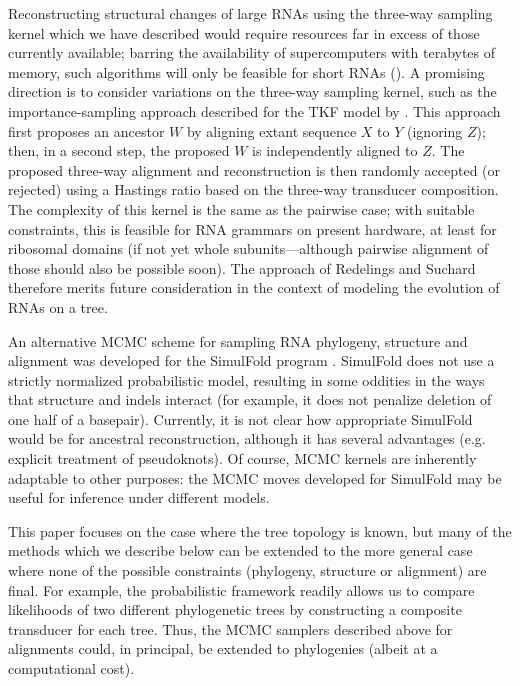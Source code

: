 \documentclass[10pt]{article}
\begin{document}

Reconstructing structural changes of large RNAs
using the three-way sampling kernel which we have described
would require resources far in excess of those currently available;
barring the availability of supercomputers with terabytes of memory,
such algorithms will only be feasible for short RNAs ().
A promising direction is to consider variations on the three-way sampling kernel,
such as the importance-sampling approach described for the TKF model
by \cite{RedelingsSuchard2005}.
This approach first proposes an ancestor $W$ by aligning extant
sequence $X$ to $Y$ (ignoring $Z$); then, in a second step, the proposed $W$ is
independently aligned to $Z$. The proposed three-way alignment and
reconstruction is then randomly accepted (or rejected) using a
Hastings ratio based on the three-way transducer composition. The
complexity of this kernel is the same as the pairwise case;
with suitable constraints, this is feasible for RNA
grammars on present hardware, at least for ribosomal domains (if not
yet whole subunits---although pairwise alignment of those should also
be possible soon). The approach of Redelings and Suchard therefore
merits future consideration in the context of modeling the evolution
of RNAs on a tree.

An alternative MCMC scheme for sampling RNA phylogeny, structure and
alignment was developed for the SimulFold program
\cite{MeyerMiklos2007}.  SimulFold does not use a strictly normalized
probabilistic model, resulting in some oddities in the ways that
structure and indels interact (for example, it does not penalize
deletion of one half of a basepair).  Currently, it is not clear how
appropriate SimulFold would be for ancestral reconstruction, although
it has several advantages (e.g. explicit treatment of pseudoknots).
Of course, MCMC kernels are inherently adaptable to other purposes:
the MCMC moves developed for SimulFold may be useful for inference
under different models.

This paper focuses on the case where the tree topology is known, but
many of the methods which we describe below can be extended to the
more general case where none of the possible constraints (phylogeny,
structure or alignment) are final.  For example, the probabilistic
framework readily allows us to compare likelihoods of two different
phylogenetic trees by constructing a composite transducer for each
tree.  Thus, the MCMC samplers described above for alignments could,
in principal, be extended to phylogenies (albeit at a computational
cost).
\end{document}
